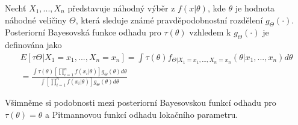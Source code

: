 \begin{definition}
Nechť $X_1, ..., X_n$ představuje náhodný výběr z $f(x|\theta)$, kde $\theta$ je hodnota náhodné veličiny $\Theta$, která sleduje známé pravděpodobnostní rozdělení $g_{\Theta}(\cdot)$. Posteriorní Bayesovská funkce odhadu pro $\tau(\theta)$ vzhledem k $g_{\Theta}(\cdot)$ je definována jako
\begin{gather*}
E[\tau{\Theta}|X_1 = x_1, ..., X_n = x_n] = \int \tau(\theta)f_{\Theta|X_1 = x_1, ..., X_n = x_n}(\theta|x_1, ..., x_n)d\theta\\
= \frac{\int \tau(\theta)\left[\prod_{i = 1}^n f(x_i|\theta)\right]g_{\Theta}(\theta)d\theta}{\int \left[\prod_{i = 1}^n f(x_i|\theta)\right]g_{\Theta}(\theta)d\theta}
\end{gather*}
\end{definition}
Všimněme si podobnosti mezi posteriorní Bayesovskou funkcí odhadu pro $\tau(\theta) = \theta$ a Pitmannovou funkcí odhadu lokačního parametru.

